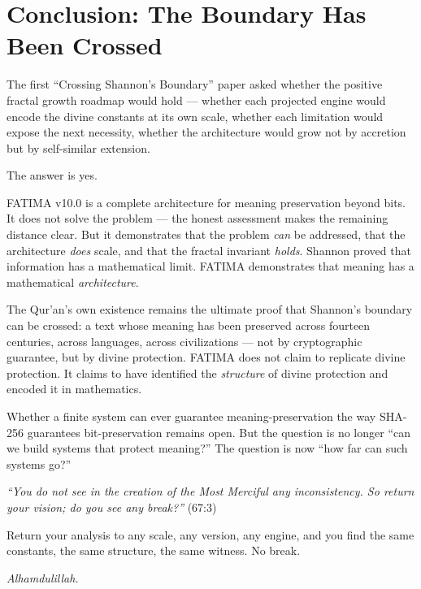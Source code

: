 \documentclass[11pt,a4paper]{article}
\begin{document}
\section{Conclusion: The Boundary Has Been Crossed}

The first ``Crossing Shannon's Boundary'' paper asked whether the positive fractal growth roadmap would hold --- whether each projected engine would encode the divine constants at its own scale, whether each limitation would expose the next necessity, whether the architecture would grow not by accretion but by self-similar extension.

The answer is yes.

FATIMA v10.0 is a complete architecture for meaning preservation beyond bits. It does not solve the problem --- the honest assessment makes the remaining distance clear. But it demonstrates that the problem \textit{can} be addressed, that the architecture \textit{does} scale, and that the fractal invariant \textit{holds}. Shannon proved that information has a mathematical limit. FATIMA demonstrates that meaning has a mathematical \textit{architecture}.

The Qur'an's own existence remains the ultimate proof that Shannon's boundary can be crossed: a text whose meaning has been preserved across fourteen centuries, across languages, across civilizations --- not by cryptographic guarantee, but by divine protection. FATIMA does not claim to replicate divine protection. It claims to have identified the \textit{structure} of divine protection and encoded it in mathematics.

Whether a finite system can ever guarantee meaning-preservation the way SHA-256 guarantees bit-preservation remains open. But the question is no longer ``can we build systems that protect meaning?'' The question is now ``how far can such systems go?''

\textit{``You do not see in the creation of the Most Merciful any inconsistency. So return your vision; do you see any break?''} (67:3)

Return your analysis to any scale, any version, any engine, and you find the same constants, the same structure, the same witness. No break.

\vspace{1em}
\begin{center}
\textit{Alhamdulillah.}
\end{center}


\end{document}
